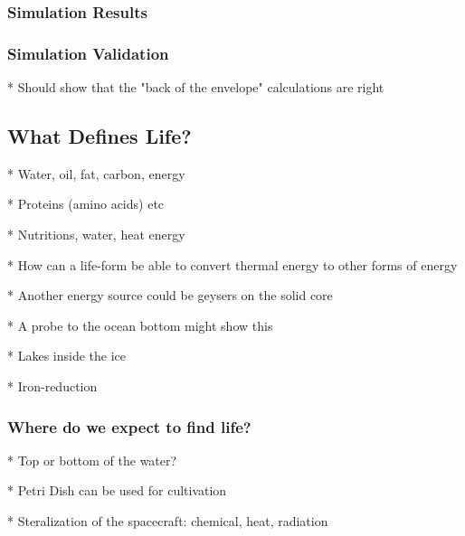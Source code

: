 \subsubsection{Simulation Results}

\subsubsection{Simulation Validation}

* Should show that the "back of the envelope" calculations are right

\subsection{What Defines Life?} %

* Water, oil, fat, carbon, energy

* Proteins (amino acids) etc

* Nutritions, water, heat energy

* How can a life-form be able to convert thermal energy to other forms of energy

* Another energy source could be geysers on the solid core

    * A probe to the ocean bottom might show this
    
* Lakes inside the ice

* Iron-reduction

\subsubsection{Where do we expect to find life?}

* Top or bottom of the water?

* Petri Dish can be used for cultivation

* Steralization of the spacecraft: chemical, heat, radiation